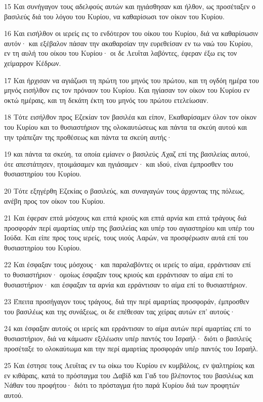 \par 15 Και συνήγαγον τους αδελφούς αυτών και ηγιάσθησαν και ήλθον, ως προσέταξεν ο βασιλεύς διά του λόγου του Κυρίου, να καθαρίσωσι τον οίκον του Κυρίου.
\par 16 Και εισήλθον οι ιερείς εις το ενδότερον του οίκου του Κυρίου, διά να καθαρίσωσιν αυτόν· και εξέβαλον πάσαν την ακαθαρσίαν την ευρεθείσαν εν τω ναώ του Κυρίου, εν τη αυλή του οίκου του Κυρίου· οι δε Λευΐται λαβόντες, έφεραν έξω εις τον χείμαρρον Κέδρων.
\par 17 Και ήρχισαν να αγιάζωσι τη πρώτη του μηνός του πρώτου, και τη ογδόη ημέρα του μηνός εισήλθον εις τον πρόναον του Κυρίου. Και ηγίασαν τον οίκον του Κυρίου εν οκτώ ημέραις, και τη δεκάτη έκτη του μηνός του πρώτου ετελείωσαν.
\par 18 Τότε εισήλθον προς Εζεκίαν τον βασιλέα και είπον, Εκαθαρίσαμεν όλον τον οίκον του Κυρίου και το θυσιαστήριον της ολοκαυτώσεως και πάντα τα σκεύη αυτού και την τράπεζαν της προθέσεως και πάντα τα σκεύη αυτής·
\par 19 και πάντα τα σκεύη, τα οποία εμίανεν ο βασιλεύς Άχαζ επί της βασιλείας αυτού, ότε απεστάτησεν, ητοιμάσαμεν και ηγιάσαμεν· και ιδού, είναι έμπροσθεν του θυσιαστηρίου του Κυρίου.
\par 20 Τότε εξηγέρθη Εζεκίας ο βασιλεύς, και συναγαγών τους άρχοντας της πόλεως, ανέβη προς τον οίκον του Κυρίου.
\par 21 Και έφεραν επτά μόσχους και επτά κριούς και επτά αρνία και επτά τράγους διά προσφοράν περί αμαρτίας υπέρ της βασιλείας και υπέρ του αγιαστηρίου και υπέρ του Ιούδα. Και είπε προς τους ιερείς, τους υιούς Ααρών, να προσφέρωσιν αυτά επί του θυσιαστηρίου του Κυρίου.
\par 22 Και έσφαξαν τους μόσχους· και παραλαβόντες οι ιερείς το αίμα, ερράντισαν επί το θυσιαστήριον· ομοίως έσφαξαν τους κριούς και ερράντισαν το αίμα επί το θυσιαστήριον· και έσφαξαν τα αρνία και ερράντισαν το αίμα επί το θυσιαστήριον.
\par 23 Έπειτα προσήγαγον τους τράγους, διά την περί αμαρτίας προσφοράν, έμπροσθεν του βασιλέως και της συνάξεως, οι δε επέθεσαν τας χείρας αυτών επ' αυτούς·
\par 24 και έσφαξαν αυτούς οι ιερείς και ερράντισαν το αίμα αυτών περί αμαρτίας επί το θυσιαστήριον, διά να κάμωσιν εξιλέωσιν υπέρ παντός του Ισραήλ· διότι ο βασιλεύς προσέταξε το ολοκαύτωμα και την περί αμαρτίας προσφοράν υπέρ παντός του Ισραήλ.
\par 25 Και έστησε τους Λευΐτας εν τω οίκω του Κυρίου εν κυμβάλοις, εν ψαλτηρίοις και εν κιθάραις, κατά το πρόσταγμα του Δαβίδ και Γαδ του βλέποντος του βασιλέως και Νάθαν του προφήτου· διότι το πρόσταγμα ήτο παρά Κυρίου διά των προφητών αυτού.
